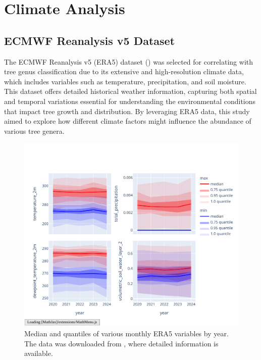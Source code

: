 \chapter{Climate Analysis}
\label{chapter:climate}
\section{ECMWF Reanalysis v5 Dataset}

The ECMWF Reanalysis v5 (ERA5) dataset (\cite{era5}) was selected for correlating with tree genus classification due to its extensive and high-resolution climate data, which includes variables such as temperature, precipitation, and soil moisture. This dataset offers detailed historical weather information, capturing both spatial and temporal variations essential for understanding the environmental conditions that impact tree growth and distribution. By leveraging ERA5 data, this study aimed to explore how different climate factors might influence the abundance of various tree genera.

\begin{figure}[ht]
    \centering
    \includegraphics[width=0.98\linewidth, trim={20pt 20pt 10pt 40pt}, clip]{figures/figures_climate/selected_variables_stats.pdf}
    \caption{Median and quantiles of various monthly ERA5 variables by year. The data was downloaded from \cite{era5_dataset}, where detailed information is available.}
    \label{fig:selected_variables_stats}
\end{figure}


